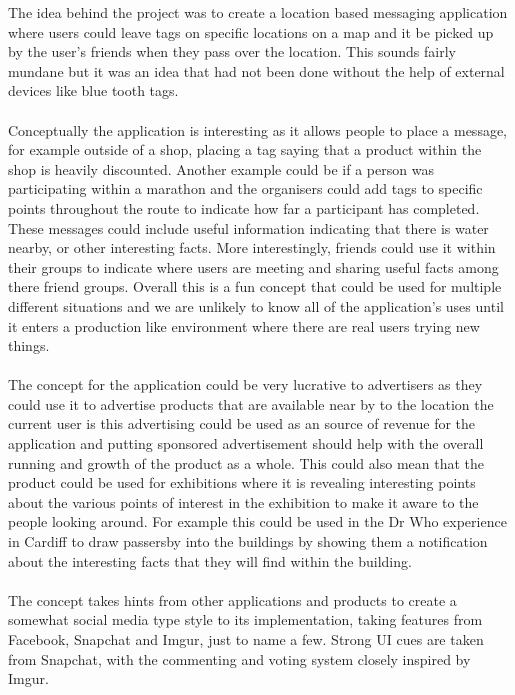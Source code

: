 The idea behind the project was to create a location based messaging application where users could leave tags on specific locations on a map and it be picked up by the user's friends when they pass over the location. This sounds fairly mundane but it was an idea that had not been done without the help of external devices like blue tooth tags.\\
\\
Conceptually the application is interesting as it allows people to place a message, for example outside of a shop, placing a tag saying that a product within the shop is heavily discounted. Another example could be if a person was participating within a marathon and the organisers could add tags to specific points throughout the route to indicate how far a participant has completed. These messages could include useful information indicating that there is water nearby, or other interesting facts. More interestingly, friends  could use it within their groups to indicate where users are meeting and sharing useful facts among there friend groups. Overall this is a fun concept that could be used for multiple different situations and we are unlikely to know all of the application's uses until it enters a production like environment where there are real users trying new things.\\
\\
The concept for the application could be very lucrative to advertisers as they could use it to advertise products that are available near by to the location the current user is this advertising could be used as an source of revenue for the application and putting sponsored advertisement should help with the overall running and growth of the product as a whole. This could also mean that the product could be used for exhibitions where it is revealing interesting points about the various points of interest in the exhibition to make it aware to the people looking around. For example this could be used in the Dr Who experience in Cardiff to draw passersby into the buildings by showing them a notification about the interesting facts that they will find within the building.\\
\\
The concept takes hints from other applications and products to create a somewhat social media type style to its implementation, taking features from Facebook, Snapchat and Imgur, just to name a few. Strong UI cues are taken from Snapchat, with the commenting and voting system closely inspired by Imgur.

